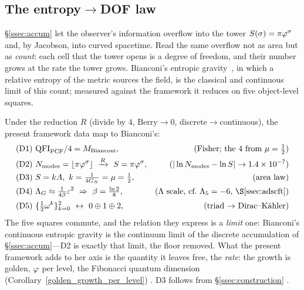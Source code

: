 \subsection{The entropy\texorpdfstring{$\to$}{->}DOF law}\label{ssec:law}
\S\ref*{ssec:accum} let the observer's information overflow into the tower $S(\sigma)=\pi\varphi^{\sigma}$
and, by Jacobson, into curved spacetime. Read the same overflow not as area but as \emph{count}:
each cell that the tower opens is a degree of freedom, and their number grows at the rate the
tower grows. Bianconi's entropic gravity~\cite{Bianconi}, in which a relative entropy of the metric sources the field, is the classical and continuous limit of this count; measured against the framework it reduces on
five object-level squares.

\begin{proposition}\label{prop:bianconi}
Under the reduction $R$ (divide by $4$, $\mathrm{Berry}\to0$, discrete$\to$continuous), the present framework
data map to Bianconi's:
\begin{align*}
\text{(D1)}\ & \mathrm{QFI}_{\mathrm{PCF}}/4=M_{\mathrm{Bianconi}}, & \text{(Fisher; the }4\text{ from }\mu=\tfrac12)\\
\text{(D2)}\ & \Nmodes=\lfloor\pi\golden^{\sigma}\rfloor\ \xrightarrow{R}\ S=\pi\golden^{\sigma}, & (|\ln\Nmodes-\ln S|\to1.4\times10^{-7})\\
\text{(D3)}\ & S=kA,\ k=\tfrac1{4G_N}=\mu=\tfrac12, & \text{(area law)}\\
\text{(D4)}\ & \Lambda_G\approx\tfrac1{4\beta}\varepsilon^2\ \Rightarrow\ \beta=\tfrac{\ln2}{8}, & \text{($\Lambda$ scale, cf.\ }\Lambda_5=-6\text{, \S\ref{ssec:adscft})}\\
\text{(D5)}\ & \{\tfrac12\omega^{k}\}_{k=0}^{2}\ \leftrightarrow\ 0\oplus1\oplus2, & \text{(triad $\to$ Dirac--K\"ahler)}
\end{align*}
The five squares commute, and the relation they express is a \emph{limit} one: Bianconi's
continuous entropic gravity is the continuum limit of the discrete accumulation of
\S\ref{ssec:accum}---D2 is exactly that limit, the floor removed. What the present framework adds
to her axis is the quantity it leaves free, the \emph{rate}: the growth is golden, $\varphi$ per
level, the Fibonacci quantum dimension (Corollary~\ref{golden_growth_per_level}) .
D3 follows from \S\ref{ssec:construction} .
\end{proposition}
